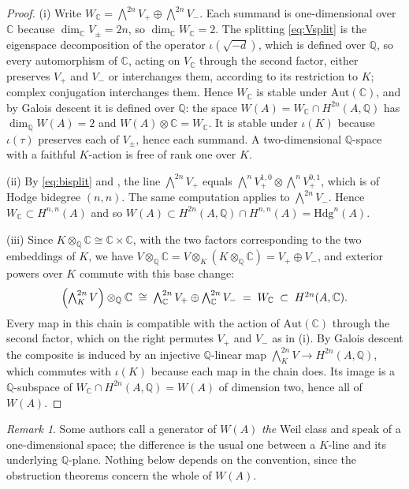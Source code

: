 \documentclass[11pt,reqno]{amsart}
\theoremstyle{plain}
\theoremstyle{definition}
\theoremstyle{remark}
\newtheorem{remark}[theorem]{Remark}
\newcommand{\QQ}{\mathbb{Q}}
\newcommand{\CC}{\mathbb{C}}
\newcommand{\Hdg}{\mathrm{Hdg}}
\newcommand{\HW}{W}                      %
\begin{document}
\begin{proof}
(i) Write $W_{\CC}=\bigwedge^{2n}V_{+}\oplus\bigwedge^{2n}V_{-}$. Each summand
is one-dimensional over $\CC$ because $\dim_{\CC}V_{\pm}=2n$, so
$\dim_{\CC}W_{\CC}=2$. The splitting \eqref{eq:Vsplit} is the eigenspace
decomposition of the operator $\iota(\sqrt{-d})$, which is defined over $\QQ$,
so every automorphism of $\CC$, acting on $V_{\CC}$ through the second
factor, either preserves $V_{+}$ and $V_{-}$ or interchanges them, according
to its restriction to $K$; complex conjugation interchanges them. Hence
$W_{\CC}$ is stable under $\mathrm{Aut}(\CC)$, and by Galois descent it is
defined over $\QQ$: the space $\HW(A)=W_{\CC}\cap H^{2n}(A,\QQ)$ has
$\dim_{\QQ}\HW(A)=2$ and $\HW(A)\otimes\CC=W_{\CC}$. It is stable under $\iota(K)$ because
$\iota(\tau)$ preserves each of $V_{\pm}$, hence each summand. A
two-dimensional $\QQ$-space with a faithful $K$-action is free of rank one
over $K$.

(ii) By \eqref{eq:bisplit} and , the line
$\bigwedge^{2n}V_{+}$ equals
$\bigwedge^{n}V^{1,0}_{+}\otimes\bigwedge^{n}V^{0,1}_{+}$, which is of Hodge
bidegree $(n,n)$. The same computation applies to $\bigwedge^{2n}V_{-}$.
Hence $W_{\CC}\subset H^{n,n}(A)$ and so
$\HW(A)\subset H^{2n}(A,\QQ)\cap H^{n,n}(A)=\Hdg^{n}(A)$.

(iii) Since $K\otimes_{\QQ}\CC\cong\CC\times\CC$, with the two factors
corresponding to the two embeddings of $K$, we have
$V\otimes_{\QQ}\CC=V\otimes_{K}(K\otimes_{\QQ}\CC)=V_{+}\oplus V_{-}$, and
exterior powers over $K$ commute with this base change:
\[
  \Bigl(\textstyle\bigwedge^{2n}_{K}V\Bigr)\otimes_{\QQ}\CC
  \;\cong\;\textstyle\bigwedge^{2n}_{\CC}V_{+}\oplus\bigwedge^{2n}_{\CC}V_{-}
  \;=\;W_{\CC}\;\subset\;H^{2n}(A,\CC).
\]
Every map in this chain is compatible with the action of $\mathrm{Aut}(\CC)$
through the second factor, which on the right permutes $V_{+}$ and $V_{-}$ as in (i).
By Galois descent the composite is induced by an injective $\QQ$-linear map
$\bigwedge^{2n}_{K}V\to H^{2n}(A,\QQ)$, which commutes with $\iota(K)$ because
each map in the chain does. Its image is a $\QQ$-subspace of
$W_{\CC}\cap H^{2n}(A,\QQ)=\HW(A)$ of dimension two, hence all of $\HW(A)$.
\end{proof}

\begin{remark}\label{rem:onedim}
Some authors call a generator of $\HW(A)$ \emph{the} Weil class and speak of a
one-dimensional space; the difference is the usual one between a $K$-line and
its underlying $\QQ$-plane. Nothing below depends on the convention, since
the obstruction theorems concern the whole of $\HW(A)$.
\end{remark}
\end{document}
